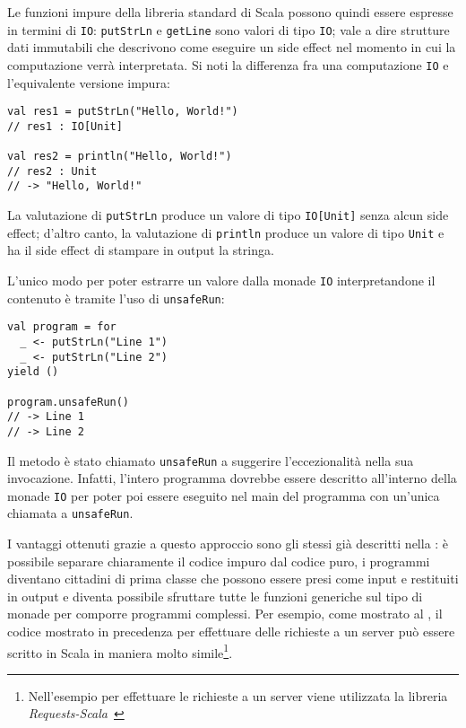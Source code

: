 Le funzioni impure della libreria standard di Scala possono quindi essere espresse in termini di \lstinline{IO}:
\lstinline{putStrLn} e \lstinline{getLine} sono valori di tipo \lstinline{IO}; vale a dire strutture dati immutabili che descrivono come eseguire un side effect nel momento in cui la computazione verrà interpretata. Si noti la differenza fra una computazione \lstinline{IO} e l'equivalente versione impura:
\begin{lstlisting}[language=scala3]
val res1 = putStrLn("Hello, World!")
// res1 : IO[Unit]

val res2 = println("Hello, World!")
// res2 : Unit
// -> "Hello, World!"
\end{lstlisting}
La valutazione di \lstinline{putStrLn} produce un valore di tipo \lstinline{IO[Unit]} senza alcun side effect; d'altro canto, la valutazione di \lstinline{println} produce un valore di tipo \lstinline{Unit} e ha il side effect di stampare in output la stringa.

L'unico modo per poter estrarre un valore dalla monade \lstinline{IO} interpretandone il contenuto è tramite l'uso di \lstinline{unsafeRun}:
\begin{lstlisting}[language=scala3]
val program = for
  _ <- putStrLn("Line 1")
  _ <- putStrLn("Line 2")
yield ()

program.unsafeRun()
// -> Line 1
// -> Line 2
\end{lstlisting}
Il metodo è stato chiamato \lstinline{unsafeRun} a suggerire l'eccezionalità nella sua invocazione. Infatti, l'intero programma dovrebbe essere descritto all'interno della monade \lstinline{IO} per poter poi essere eseguito nel main del programma con un'unica chiamata a \lstinline{unsafeRun}.

I vantaggi ottenuti grazie a questo approccio sono gli stessi già descritti nella : è possibile separare chiaramente il codice impuro dal codice puro, i programmi diventano cittadini di prima classe che possono essere presi come input e restituiti in output e diventa possibile sfruttare tutte le funzioni generiche sul tipo di monade per comporre programmi complessi. Per esempio, come mostrato al , il codice mostrato in precedenza per effettuare delle richieste a un server può essere scritto in Scala in maniera molto simile\footnote{Nell'esempio per effettuare le richieste a un server viene utilizzata la libreria \emph{Requests-Scala}~\cite{cit:requests-scala}}.

